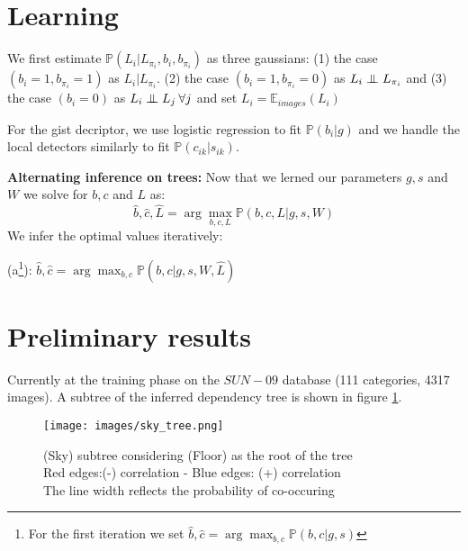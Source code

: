 \documentclass[11pt]{article}
\newcommand{\p}{\mathbb{P}}
\newcommand{\indep}{\mathrel{\perp\mspace{-10mu}\perp}}
\begin{document}
\begin{multicols}{2}
\section*{Learning}
We first estimate $\p(L_i|L_{\pi_i},b_i,b_{\pi_i})$ as three gaussians: (1) the case $(b_i=1,b_{\pi_i}=1)$ as $L_i|L_{\pi_i}$. (2) the case $(b_i=1,b_{\pi_i}=0)$ as $L_i\indep L_{\pi_i}$ and (3) the case $(b_i=0)$ as $L_i\indep L_j\:\forall j$ and set $L_i=\mathbb E_{images}(L_i)$

For the gist decriptor, we use logistic regression to fit $\p(b_i|g)$ and we handle the local detectors similarly to fit $\p(c_{ik}|s_{ik})$.

\textbf{Alternating inference on trees:} Now that we lerned our parameters $g,s$ and $W$ we solve for $b,c$ and $L$ as:
\[\hat b,\hat c,\hat L=\arg\max_{b,c,L}\p(b,c,L|g,s,W)\]
We infer the optimal values iteratively:

(a\footnote{For the first iteration we set $\hat b,\hat c=\arg\max_{b,c}\p(b,c|g,s)$}): $\hat b,\hat c=\arg\max_{b,c}\p(b,c|g,s,W,\hat L)$

\section*{Preliminary results}
Currently at the training phase on the $SUN-09$ database (111 categories, 4317 images). A subtree of the inferred dependency tree is shown in figure \ref{sky}.
\end{multicols}

\begin{figure}[H]
\centering
{}
\caption{}
\end{figure}

\begin{figure}[H]
\centering
\texttt{[image: images/sky\_tree.png]}
\caption{\small (Sky) subtree considering (Floor) as the root of the tree\label{sky}\\
Red edges:(-) correlation -  Blue edges: (+) correlation\\ The line width reflects the probability of co-occuring }
\end{figure}
\end{document}
